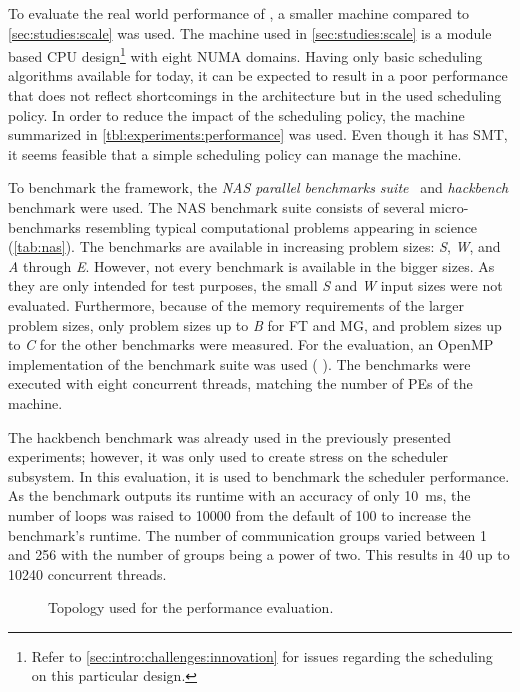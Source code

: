 To evaluate the real world performance of \cobas{}, a smaller machine compared to \cref{sec:studies:scale} was used. The machine used in \cref{sec:studies:scale} is a module based CPU design\footnote{Refer to \cref{sec:intro:challenges:innovation} for issues regarding the scheduling on this particular design.} with eight NUMA domains. Having only basic scheduling algorithms available for \cobas{} today, it can be expected to result in a poor performance that does not reflect shortcomings in the \cobas{} architecture but in the used scheduling policy. In order to reduce the impact of the scheduling policy, the machine summarized in \cref{tbl:experiments:performance} was used. Even though it has \ac{SMT}, it seems feasible that a simple scheduling policy can manage the machine.

To benchmark the \cobas{} framework, the \emph{\ac{NAS} parallel benchmarks suite}~\cite{Bailey-1991-NPB,BaileyEtAl-1994-Npb,NAS} and \emph{hackbench} benchmark were used. The \ac{NAS} benchmark suite consists of several micro-benchmarks resembling typical computational problems appearing in science (\cref{tab:nas}). The benchmarks are available in increasing problem sizes: \emph{S}, \emph{W},
and \emph{A} through \emph{E}. However, not every benchmark is available in the bigger sizes. As they are only intended for test purposes, the small \emph{S} and \emph{W} input sizes were not evaluated. Furthermore, because of the memory requirements of the larger problem sizes, only problem sizes up to \emph{B} for FT and MG, and problem sizes up to \emph{C} for the other benchmarks were measured. For the evaluation, an OpenMP implementation of the benchmark suite was used (\cf{} \textcite{JiFrYa-1999-OpenMpNpb}). The benchmarks were executed with eight concurrent threads, matching the number of \acp{PE} of the machine.

The hackbench benchmark was already used in the previously presented experiments; however, it was only used to create stress on the scheduler subsystem. In this evaluation, it is used to benchmark the scheduler performance. As the benchmark outputs its runtime with an accuracy of only \SI{10}{\milli\second}, the number of loops was raised to \num{10000} from the default of \num{100} to increase the benchmark's runtime. The number of communication groups varied between \num{1} and \num{256} with the number of groups being a power of two. This results in \num{40} up to \num{10240} concurrent threads.

\begin{figure}[!b] \centering
	\caption{Topology used for the \cobas{} performance evaluation.}%
	\label{fig:eval:performance-topo}
\end{figure}

